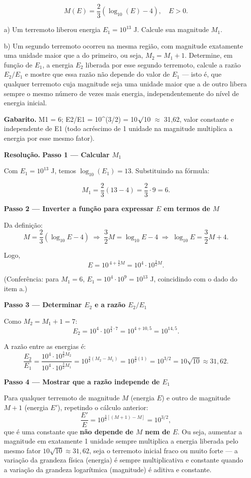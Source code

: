 \documentclass[11pt,a4paper]{article}
\begin{document}
$$M(E) = \frac{2}{3}\left(\log_{10}(E) - 4\right), \quad E > 0.$$

a) Um terremoto liberou energia $E_1 = 10^{13}$ J. Calcule sua magnitude $M_1$.

b) Um segundo terremoto ocorreu na mesma região, com magnitude exatamente uma unidade maior que a do primeiro, ou seja, $M_2 = M_1 + 1$. Determine, em função de $E_1$, a energia $E_2$ liberada por esse segundo terremoto, calcule a razão $E_2/E_1$ e mostre que essa razão não depende do valor de $E_1$ — isto é, que qualquer terremoto cuja magnitude seja uma unidade maior que a de outro libera sempre o mesmo número de vezes mais energia, independentemente do nível de energia inicial.

\textbf{Gabarito.} M1 = 6; E2/E1 = 10\textasciicircum{}(3/2) = 10$\surd$10 $\approx$ 31,62, valor constante e independente de E1 (todo acréscimo de 1 unidade na magnitude multiplica a energia por esse mesmo fator).

\textbf{Resolução.} \textbf{Passo 1 — Calcular $M_1$}

Com $E_1 = 10^{13}$ J, temos $\log_{10}(E_1) = 13$. Substituindo na fórmula:

$$M_1 = \frac{2}{3}\left(13 - 4\right) = \frac{2}{3}\cdot 9 = 6.$$

\textbf{Passo 2 — Inverter a função para expressar $E$ em termos de $M$}

Da definição:
$$M = \frac{2}{3}\left(\log_{10}E - 4\right) \;\Rightarrow\; \frac{3}{2}M = \log_{10}E - 4 \;\Rightarrow\; \log_{10}E = \frac{3}{2}M + 4.$$

Logo,
$$E = 10^{\,4 + \frac{3}{2}M} = 10^{4}\cdot 10^{\frac{3}{2}M}.$$

(Conferência: para $M_1=6$, $E_1 = 10^4\cdot10^{9} = 10^{13}$ J, coincidindo com o dado do item a.)

\textbf{Passo 3 — Determinar $E_2$ e a razão $E_2/E_1$}

Como $M_2 = M_1+1 = 7$:
$$E_2 = 10^{4}\cdot 10^{\frac{3}{2}\cdot 7} = 10^{4+10{,}5} = 10^{14{,}5}.$$

A razão entre as energias é:
$$\frac{E_2}{E_1} = \frac{10^{4}\cdot10^{\frac{3}{2}M_2}}{10^{4}\cdot10^{\frac{3}{2}M_1}} = 10^{\frac{3}{2}(M_2-M_1)} = 10^{\frac{3}{2}(1)} = 10^{3/2} = 10\sqrt{10} \approx 31{,}62.$$

\textbf{Passo 4 — Mostrar que a razão independe de $E_1$}

Para qualquer terremoto de magnitude $M$ (energia $E$) e outro de magnitude $M+1$ (energia $E'$), repetindo o cálculo anterior:
$$\frac{E'}{E} = 10^{\frac{3}{2}\left[(M+1)-M\right]} = 10^{3/2},$$
que é uma constante que \textbf{não depende de $M$ nem de $E$}. Ou seja, aumentar a magnitude em exatamente 1 unidade sempre multiplica a energia liberada pelo mesmo fator $10\sqrt{10}\approx 31{,}62$, seja o terremoto inicial fraco ou muito forte — a variação da grandeza física (energia) é sempre multiplicativa e constante quando a variação da grandeza logarítmica (magnitude) é aditiva e constante.
\end{document}
